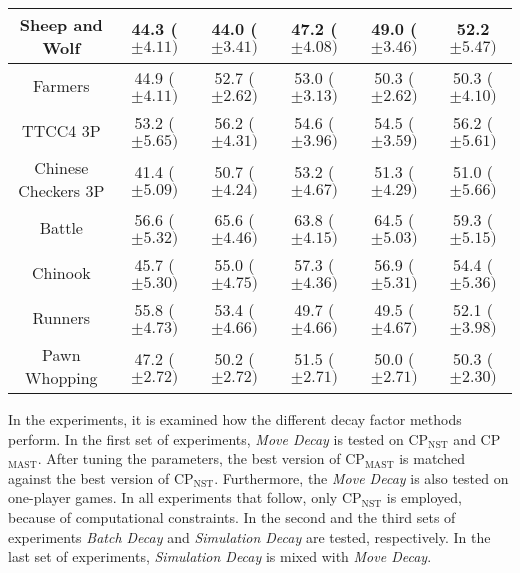 \documentclass[journal]{IEEEtran}
\begin{document}
\begin{table*}[t]
\begin{tabular}{|c|c|c|c|c|c|}
Sheep and Wolf & 44.3 ($\pm 4.11 )$ & 44.0 ($\pm 3.41)$ & 47.2 ($\pm 4.08)$ & 49.0 ($\pm 3.46)$ & 52.2 $\pm 5.47)$ \\ 
\hline
Farmers & 44.9 ($\pm 4.11)$ & 52.7  ($\pm 2.62)$ &  53.0 ($\pm 3.13)$ & 50.3  ($\pm 2.62)$ & 50.3 ($\pm 4.10)$ \\ 
TTCC4 3P & 53.2 ($\pm 5.65 )$ & 56.2 ($\pm 4.31)$ &  54.6 ($\pm 3.96)$ & 54.5  ($\pm 3.59)$ & 56.2  ($\pm 5.61)$ \\ 
Chinese Checkers 3P &  41.4 ($\pm 5.09)$ & 50.7  ($\pm 4.24)$ & 53.2 ($\pm 4.67)$ & 51.3  ($\pm 4.29)$ & 51.0  ($\pm 5.66)$ \\ 
\hline
Battle & 56.6 ($\pm 5.32)$ & 65.6 ($\pm 4.46)$ &  63.8 ($\pm 4.15)$ &  64.5 ($\pm 5.03 )$ &  59.3 ($\pm 5.15)$ \\ 
Chinook &  45.7 ($\pm 5.30)$ & 55.0 ($\pm 4.75 )$ &  57.3 ($\pm 4.36 )$ & 56.9  ($\pm 5.31 )$ & 54.4 ($\pm 5.36)$ \\ 
Runners &  55.8 ($\pm 4.73)$ & 53.4 ($\pm 4.66)$ & 49.7  ($\pm 4.66)$ & 49.5  ($\pm 4.67)$ & 52.1  ($\pm 3.98)$ \\ 
Pawn Whopping & 47.2 ($\pm 2.72)$ & 50.2 ($\pm 2.72)$ & 51.5 ($\pm 2.71)$ & 50.0 ($\pm 2.71)$ & 50.3  ($\pm 2.30)$ \\ \hline 
\end{tabular}
\end{table*}

\label{sec:results}
In the experiments, it is examined how the different decay factor methods perform. In the first set of experiments, \textit{Move Decay} is tested on CP$_{\textrm{NST}}$ and CP$_{\textrm{MAST}}$. After tuning the parameters, the best version of CP$_{\textrm{MAST}}$ is matched against the best version of CP$_{\textrm{NST}}$. Furthermore, the \textit{Move Decay} is also tested on one-player games. 
In all experiments that follow, only CP$_{\textrm{NST}}$ is employed, because of computational constraints. In the second and the third sets of experiments \textit{Batch Decay} and \textit{Simulation Decay} are tested, respectively. In the last set of experiments, \textit{Simulation Decay} is mixed with \textit{Move Decay}.
\end{document}
